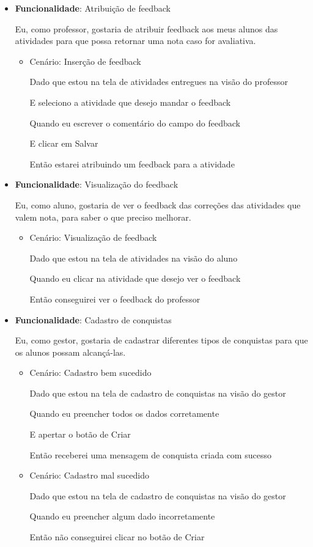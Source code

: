 \documentclass[
    12pt,               %
    openright,          %
    oneside,
    a4paper,            %
    english,            %
    brazil              %
    ]{ifsp-spo-inf-ctds} %
\begin{document}
\begin{itemize}
\item\textbf{Funcionalidade}: Atribuição de \gls{feedback}
    
    Eu, como professor, gostaria de atribuir \gls{feedback} aos meus alunos das atividades para que possa retornar uma nota caso for avaliativa.
    \begin{itemize}
        \item Cenário: Inserção de \gls{feedback}
        \par Dado que estou na tela de atividades entregues na visão do professor
        \par E seleciono a atividade que desejo mandar o feedback
        \par Quando eu escrever o comentário do campo do feedback
        \par E clicar em Salvar
        \par Então estarei atribuindo um feedback para a atividade
    \end{itemize}

\item\textbf{Funcionalidade}: Visualização do \gls{feedback}
    
    Eu, como aluno, gostaria de ver o \gls{feedback} das correções das atividades que valem nota, para saber o que preciso melhorar.
    \begin{itemize}
        \item Cenário: Visualização de \gls{feedback}
        \par Dado que estou na tela de atividades na visão do aluno
        \par Quando eu clicar na atividade que desejo ver o feedback
        \par Então conseguirei ver o feedback do professor
    \end{itemize}

\item\textbf{Funcionalidade}: Cadastro de conquistas
    
    Eu, como gestor, gostaria de cadastrar diferentes tipos de conquistas para que os alunos possam alcançá-las.
    \begin{itemize}
        \item Cenário: Cadastro bem sucedido  
        \par Dado que estou na tela de cadastro de conquistas na visão do gestor
        \par Quando eu preencher todos os dados corretamente
        \par E apertar o botão de Criar
        \par Então receberei uma mensagem de conquista criada com sucesso
    \end{itemize}   
    \begin{itemize}
        \item Cenário: Cadastro mal sucedido  
        \par Dado que estou na tela de cadastro de conquistas na visão do gestor
        \par Quando eu preencher algum dado incorretamente
        \par Então não conseguirei clicar no botão de Criar
    \end{itemize}   


\end{itemize}
\end{document}
